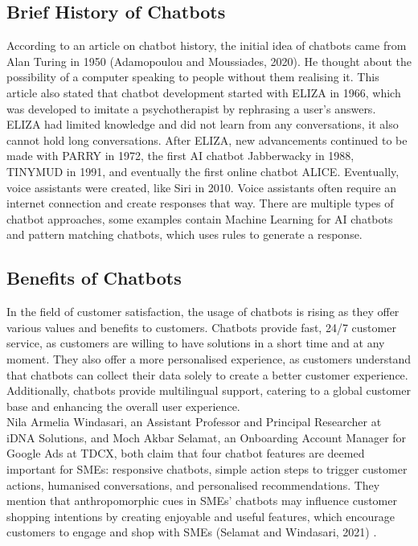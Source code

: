 \documentclass[a4paper]{article}
\begin{document}
\subsection{Brief History of Chatbots}

According to an article on chatbot history, the initial idea of chatbots came from Alan Turing in 1950 (Adamopoulou and Moussiades, 2020)\cite{chatbothistory}. He thought about the possibility of a computer speaking to people without them realising it. This article also stated that chatbot development started with ELIZA in 1966, which was developed to imitate a psychotherapist by rephrasing a user's answers. ELIZA had limited knowledge and did not learn from any conversations, it also cannot hold long conversations. After ELIZA, new advancements continued to be made with PARRY in 1972, the first AI chatbot Jabberwacky in 1988, TINYMUD in 1991, and eventually the first online chatbot ALICE. Eventually, voice assistants were created, like Siri in 2010. Voice assistants often require an internet connection and create responses that way. There are multiple types of chatbot approaches, some examples contain Machine Learning for AI chatbots and pattern matching chatbots, which uses rules to generate a response.
 
\subsection{Benefits of Chatbots}

In the field of customer satisfaction, the usage of chatbots is rising as they offer various values and benefits to customers. Chatbots provide fast, 24/7 customer service, as customers are willing to have solutions in a short time and at any moment. They also offer a more personalised experience, as customers understand that chatbots can collect their data solely to create a better customer experience. Additionally, chatbots provide multilingual support, catering to a global customer base and enhancing the overall user experience.
\\
Nila Armelia Windasari, an Assistant Professor and Principal Researcher at iDNA Solutions, and Moch Akbar Selamat, an Onboarding Account Manager for Google Ads at TDCX, both claim that four chatbot features are deemed important for SMEs: responsive chatbots, simple action steps to trigger customer actions, humanised conversations, and personalised recommendations. They mention that anthropomorphic cues in SMEs' chatbots may influence customer shopping intentions by creating enjoyable and useful features, which encourage customers to engage and shop with SMEs (Selamat and Windasari, 2021) \cite{Selamat2021}.
\end{document}
